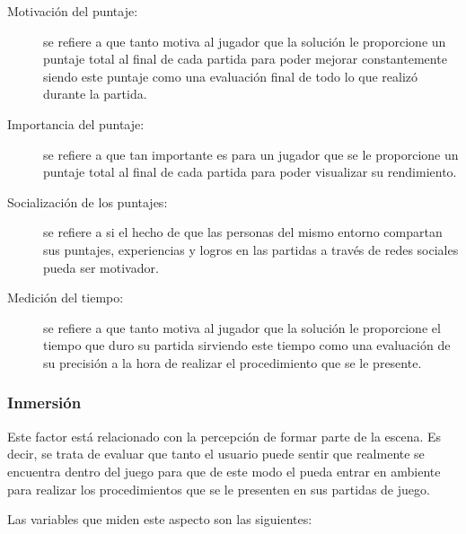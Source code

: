\begin{description}

\item[Motivación del puntaje:] se refiere a que tanto motiva al jugador que la
    solución le proporcione un puntaje total al final de cada partida para poder
    mejorar constantemente siendo este puntaje como una evaluación final de todo
    lo que realizó durante la partida.

\item[Importancia del puntaje:] se refiere a que tan importante es para un
    jugador que se le proporcione un puntaje total al final de cada partida para
    poder visualizar su rendimiento.

\item[Socialización de los puntajes:] se refiere a si el hecho de que las
    personas del mismo entorno compartan sus puntajes, experiencias y logros en
    las partidas a través de redes sociales pueda ser motivador.

\item[Medición del tiempo:] se refiere a que tanto motiva al
    jugador que la solución le proporcione el tiempo que duro su partida
    sirviendo este tiempo como una evaluación de su precisión a la hora de
    realizar el procedimiento que se le presente.

\end{description} 


\subsubsection{Inmersión}
\label{sec:sub_inmersion}

Este factor está relacionado con la percepción de formar
parte de la escena. Es decir, se trata de evaluar que tanto el usuario puede
sentir que realmente se encuentra dentro del juego para que de este modo el
pueda entrar en ambiente para realizar los procedimientos que se le presenten en
sus partidas de juego.

Las variables que miden este aspecto son las siguientes:


